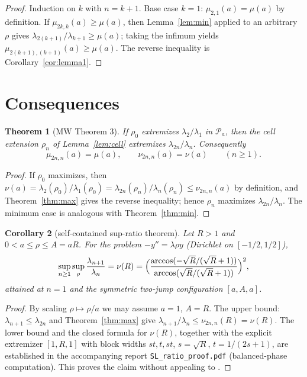 ﻿\documentclass[11pt]{article}
\newtheorem{theorem}{Theorem}[section]
\newtheorem{corollary}[theorem]{Corollary}
\begin{document}
\begin{proof}
	Induction on $k$ with $n=k+1$.  Base case $k=1$:
	$\mu_{2,1}(a)=\mu(a)$ by definition.  If
	$\mu_{2k,k}(a)\ge\mu(a)$, then Lemma~\ref{lem:min} applied to an
	arbitrary $\rho$ gives $\lambda_{2(k+1)}/\lambda_{k+1}\ge\mu(a)$;
	taking the infimum yields
	$\mu_{2(k+1),(k+1)}(a)\ge\mu(a)$.  The reverse inequality is
	Corollary~\ref{cor:lemma1}.
\end{proof}

\section{Consequences}

\begin{theorem}[MW Theorem 3]\label{thm:theorem3}
	If $\rho_0$ extremizes $\lambda_2/\lambda_1$ in $\mathcal P_a$, then the
	cell extension $\rho_n$ of Lemma~\ref{lem:cell} extremizes
	$\lambda_{2n}/\lambda_n$.  Consequently
	\begin{equation*}
		\mu_{2n,n}(a)=\mu(a),\qquad
		\nu_{2n,n}(a)=\nu(a)\qquad(n\ge 1).
	\end{equation*}
\end{theorem}

\begin{proof}
	If $\rho_0$ maximizes, then $\nu(a)=\lambda_2(\rho_0)/\lambda_1(\rho_0)
	=\lambda_{2n}(\rho_n)/\lambda_n(\rho_n)\le\nu_{2n,n}(a)$ by definition,
	and Theorem~\ref{thm:max} gives the reverse inequality; hence $\rho_n$
	maximizes $\lambda_{2n}/\lambda_n$.  The minimum case is analogous with
	Theorem~\ref{thm:min}.
\end{proof}

\begin{corollary}[self-contained sup-ratio theorem]\label{cor:sup}
	Let $R>1$ and $0<a\le\rho\le A=aR$.  For the problem
	$-y''=\lambda\rho y$ (Dirichlet on $[-1/2,1/2]$),
	\begin{equation*}
		\sup_{n\ge 1}\sup_{\rho}\frac{\lambda_{n+1}}{\lambda_n}
		=\nu(R)=\Bigl(\frac{\arccos(-\sqrt{R}/(\sqrt{R}+1))}
		{\arccos(\sqrt{R}/(\sqrt{R}+1))}\Bigr)^2,
	\end{equation*}
	attained at $n=1$ and the symmetric two-jump configuration
	$[a,A,a]$.
\end{corollary}

\begin{proof}
	By scaling $\rho\mapsto\rho/a$ we may assume $a=1$, $A=R$.
	The upper bound: $\lambda_{n+1}\le\lambda_{2n}$ and
	Theorem~\ref{thm:max} give
	$\lambda_{n+1}/\lambda_n\le\nu_{2n,n}(R)=\nu(R)$.
	The lower bound and the closed formula for $\nu(R)$, together with the
	explicit extremizer $[1,R,1]$ with block widths
	$s t,t,s t$, $s=\sqrt R$, $t=1/(2s+1)$, are established in the
	accompanying report \texttt{SL\_ratio\_proof.pdf} (balanced-phase
	computation).  This proves the claim without appealing to
	\cite[Lemmas 1--2]{mw}.
\end{proof}
\end{document}
